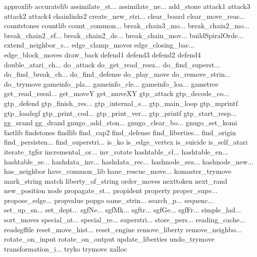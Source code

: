 approxlib
accuratelib
assimilate_st...
assimilate_ne...
add_stone
attack1
attack3
attack2
attack4
chainlinks2
create_new_stri...
clear_board
clear_move_reas...
countstones
countlib
count_common...
break_chain3_mo...
break_chain2_mo...
break_chain2_ef...
break_chain2_de...
break_chain_mov...
buildSpiralOrde...
extend_neighbor_s...
edge_clamp_moves
edge_closing_bac...
edge_block_moves
draw_back
defend1
defend3
defend2
defend4
double_atari_ch...
do_attack
do_get_read_resu...
do_find_superst...
do_find_break_ch...
do_find_defense
do_play_move
do_remove_strin...
do_trymove
gameinfo_pla...
gameinfo_cle...
gameinfo_loa...
gametree
get_read_resul...
get_moveY
get_moveXY
gtp_attack
gtp_decode_co...
gtp_defend
gtp_finish_res...
gtp_internal_s...
gtp_main_loop
gtp_mprintf
gtp_loadsgf
gtp_print_cod...
gtp_print_ver...
gtp_printf
gtp_start_resp...
gg_srand
gg_drand
gnugo_add_ston...
gnugo_clear_bo...
gnugo_set_komi
fastlib
findstones
findlib
find_cap2
find_defense
find_liberties...
find_origin
find_persisten...
find_superstri...
is_ko
is_edge_vertex
is_suicide
is_self_atari
iterate_tgfsr
incremental_or...
inv_rotate
hashtable_cl...
hashtable_en...
hashtable_se...
hashdata_inv...
hashdata_rec...
hashnode_sea...
hashnode_new...
has_neighbor
have_common_lib
hane_rescue_move...
komaster_trymove
mark_string
match
liberty_of_string
order_moves
nexttoken
next_rand
new_position
node
propagate_st...
propident
property
proper_supe...
propose_edge...
propvalue
popgo
same_strin...
search_p...
sequenc...
set_up_sn...
set_dept...
sgfNe...
sgfMk...
sgftr...
sgfGe...
sgfFr...
simple_lad...
sort_moves
special_at...
special_re...
superstri...
store_pers...
reading_cache...
readsgffile
reset_move_hist...
reset_engine
remove_liberty
remove_neighbo...
rotate_on_input
rotate_on_output
update_liberties
undo_trymove
transformation_i...
tryko
trymove
xalloc
